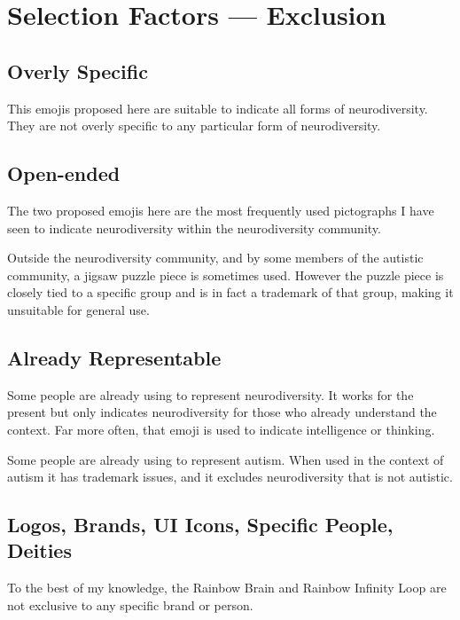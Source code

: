 \section{Selection Factors --- Exclusion}

\setcounter{subsection}{5}

\subsection{Overly Specific}

This emojis proposed here are suitable to indicate all forms of neurodiversity. They are not
overly specific to any particular form of neurodiversity.

\subsection{Open-ended}

The two proposed emojis here are the most frequently used pictographs I have seen to indicate
neurodiversity within the neurodiversity community.

Outside the neurodiversity community, and by some members of the autistic community, a jigsaw
puzzle piece is sometimes used. However the puzzle piece is closely tied to a specific group
and is in fact a trademark of that group, making it unsuitable for general use.

\subsection{Already Representable}

Some people are already using \brainemoji{} to represent neurodiversity.
It works for the present but only indicates neurodiversity for those
who already understand the context. Far more often, that emoji is used to indicate intelligence
or thinking.

Some people are already using \jigsawemoji{} to represent autism.
When used in the context of autism it has trademark issues, and it
excludes neurodiversity that is not autistic.

\subsection{Logos, Brands, UI Icons, Specific People, Deities}

To the best of my knowledge, the Rainbow Brain and Rainbow Infinity Loop are not exclusive to
any specific brand or person.


